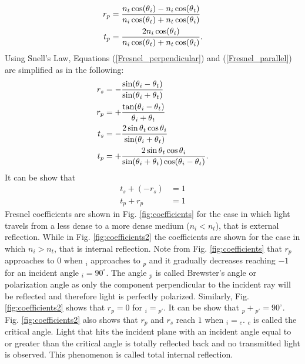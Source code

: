 \begin{equation}\label{Fresnel_parallel}
\begin{split}
r_{p} & = \frac{n_t\cos(\mbox{$\theta$}_i)-n_i \cos(\mbox{$\theta$}_t)}{n_i \cos(\mbox{$\theta$}_t)+n_t\cos(\mbox{$\theta$}_i)}\\
t_{p} & =  \frac{2n_i\cos(\mbox{$\theta$}_i)}{n_i\cos(\mbox{$\theta$}_t)+n_t\cos(\mbox{$\theta$}_i)}.
\end{split}
\end{equation}
Using Snell's Law, Equations (\ref{Fresnel_perpendicular}) and (\ref{Fresnel_parallel}) are simplified as in the following:
\begin{equation} \label{simple_Fresnel}
\begin{split}
r_{s} & = -\frac{\sin(\mbox{$\theta$}_i-\mbox{$\theta$}_t)}{\sin(\mbox{$\theta$}_i+\mbox{$\theta$}_t)}\\
r_{p} & =  +\frac{\tan(\mbox{$\theta$}_i-\mbox{$\theta$}_t)}{\mbox{$\theta$}_i+\mbox{$\theta$}_t}\\
t_{s} & = -\frac{2\sin \mbox{$\theta$}_t \cos \mbox{$\theta$}_i}{\sin(\mbox{$\theta$}_i+\mbox{$\theta$}_t)}\\
t_{p} & = +\frac{2\sin \mbox{$\theta$}_t \cos \mbox{$\theta$}_i}{\sin(\mbox{$\theta$}_i+\mbox{$\theta$}_t)\cos(\mbox{$\theta$}_i- \mbox{$\theta$}_t)}.
\end{split}
\end{equation}
It can be show that
 \begin{equation}
\begin{split}
t_s+(-r_s) &= 1 \\
t_p+r_p &=  1
\end{split}
\end{equation}
Fresnel coefficients are shown in Fig. \ref{fig:coefficients} for the case in which light travels from a less dense to a more dense medium ($n_i<n_t$), that is external reflection. 
While in Fig. \ref{fig:coefficients2} the coefficients are shown for the case in which $n_i>n_t$, that is internal reflection. Note from Fig. \ref{fig:coefficients} that $r_p$ approaches to $0$ when \myangle$_i$ approaches to \myangle$_p$ and it gradually decreases reaching $-1$ for an incident angle \myangle$_i=90^\circ$. The angle \myangle$_p$ is called Brewster's angle or polarization angle as only the component perpendicular to the incident ray will be reflected and therefore light is perfectly polarized. Similarly, Fig. \ref{fig:coefficients2} shows that $r_p=0$ for \myangle$_i=$\myangle$_{p\prime}$. It can be show that \myangle$_p+$\myangle$_{p\prime}= 90^\circ$. Fig. \ref{fig:coefficients2} also shows that $r_p$ and $r_s$ reach $1$ when \myangle$_i=$\myangle$_c$. \myangle$_c$ is called the critical angle. Light that hits the incident plane with an incident angle equal to or greater than the critical angle is totally reflected back and no transmitted light is observed. This phenomenon is called total internal reflection. 
